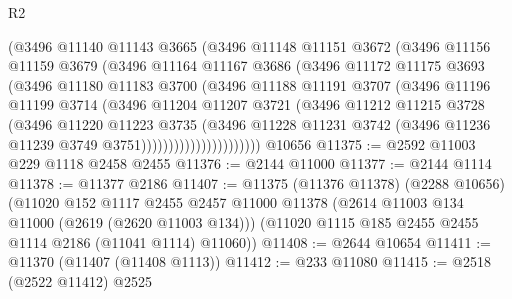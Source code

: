 \begin{lexlean}{R2}
\begin{coremodule}
                      (@3496
                        @11140
                        @11143
                        @3665
                        (@3496
                          @11148
                          @11151
                          @3672
                          (@3496
                            @11156
                            @11159
                            @3679
                            (@3496
                              @11164
                              @11167
                              @3686
                              (@3496
                                @11172
                                @11175
                                @3693
                                (@3496
                                  @11180
                                  @11183
                                  @3700
                                  (@3496
                                    @11188
                                    @11191
                                    @3707
                                    (@3496
                                      @11196
                                      @11199
                                      @3714
                                      (@3496
                                        @11204
                                        @11207
                                        @3721
                                        (@3496
                                          @11212
                                          @11215
                                          @3728
                                          (@3496
                                            @11220
                                            @11223
                                            @3735
                                            (@3496
                                              @11228
                                              @11231
                                              @3742
                                              (@3496 @11236 @11239 @3749 @3751))))))))))))))))))))))
    @10656
@11375 := @2592 @11003 @229 @1118 @2458 @2455
@11376 := @2144 @11000
@11377 := @2144 @1114
@11378 := @11377 @2186
@11407 := @11375
    (@11376 @11378)
    (@2288 @10656)
    (@11020
      @152
      @1117
      @2455
      @2457
      @11000
      @11378
      (@2614 @11003 @134 @11000 (@2619 (@2620 @11003 @134)))
      (@11020 @1115 @185 @2455 @2455 @1114 @2186 (@11041 @1114) @11060))
@11408 := @2644 @10654
@11411 := @11370 (@11407 (@11408 @1113))
@11412 := @233 @11080
@11415 := @2518 (@2522 @11412) @2525

\end{coremodule}
\end{lexlean}
